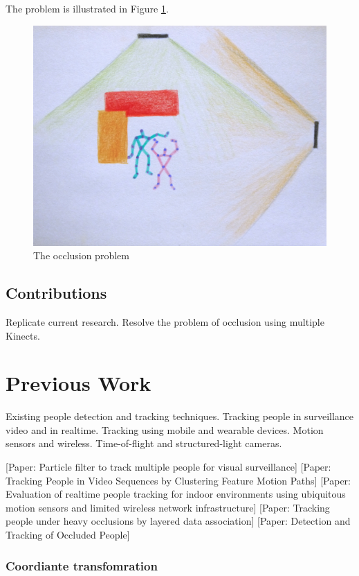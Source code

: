 \documentclass{sigchi}
\begin{document}
The problem is illustrated in Figure \ref{fig:occlusion_problem}.

\begin{figure}
  \centering
  \includegraphics[width=0.9\columnwidth]{occlusion_problem}
  \caption{The occlusion problem}
  \label{fig:occlusion_problem}
\end{figure}

\subsection{Contributions}

Replicate current research. Resolve the problem of occlusion using multiple Kinects. 

\section{Previous Work}

Existing people detection and tracking techniques. Tracking people in surveillance video and in realtime. Tracking using mobile and wearable devices. Motion sensors and wireless. Time-of-flight and structured-light cameras.

[Paper: Particle filter to track multiple people for visual surveillance]
[Paper: Tracking People in Video Sequences by Clustering Feature Motion Paths]
[Paper: Evaluation of realtime people tracking for indoor environments using ubiquitous motion sensors and limited wireless network infrastructure]
[Paper: Tracking people under heavy occlusions by layered data association]
[Paper: Detection and Tracking of Occluded People]

\subsubsection{Coordiante transfomration}
\end{document}
